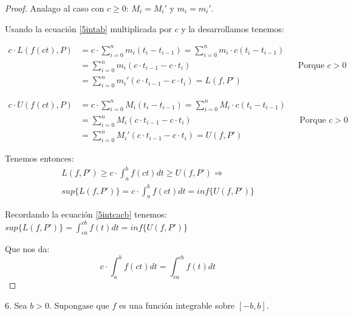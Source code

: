 \documentclass[12pt]{article}
\begin{document}
\begin{proof}
    Analago al caso con $c\geq0$: $M_i=M_i'$ y $m_i=m_i'$.

    Usando la ecuaci\'on \eqref{5intab} multiplicada por $c$ y la desarrollamos tenemos:

    \begin{align*}
        c\cdot L(f(ct),P) &= c \cdot \sum_{i=0}^n m_i(t_i-t_{i-1}) = \sum_{i=0}^n m_i\cdot c(t_i-t_{i-1}) \\
        &= \sum_{i=0}^n m_i(c\cdot t_{i-1}-c\cdot t_i) \quad &&\text{Porque $c>0$}\\
        &= \sum_{i=0}^n m_i'(c\cdot t_{i-1}-c\cdot t_i) = L(f,P')
    \end{align*}

    \begin{align*}
        c\cdot U(f(ct),P) &= c \cdot \sum_{i=0}^n M_i(t_i-t_{i-1}) = \sum_{i=0}^n M_i\cdot c(t_i-t_{i-1}) \\
        &= \sum_{i=0}^n M_i(c\cdot t_{i-1}-c\cdot t_i) \quad &&\text{Porque $c>0$}\\
        &= \sum_{i=0}^n M_i'(c\cdot t_{i-1}-c\cdot t_i) = U(f,P')
    \end{align*}

    Tenemos entonces:
    \begin{multline*}
        L(f,P')\geq c\cdot\int_{a}^{b}f(ct)dt\geq U(f,P') \Longrightarrow \\ sup\{L(f,P')\}=c\cdot\int_{a}^{b}f(ct)dt=inf\{U(f,P')\}
    \end{multline*}

    Recordando la ecuaci\'on \eqref{5intcacb} tenemos: \(sup\{L(f,P')\}=\displaystyle\int_{ca}^{cb}f(t)dt=inf\{U(f,P')\}\)

    Que nos da:
    \begin{equation*}
        c\cdot\int_{a}^{b}f(ct)dt=\int_{ca}^{cb}f(t)dt
    \end{equation*}

\end{proof}

6. Sea $b>0$. Supongase que $f$ es una funci\'on integrable sobre $[-b,b]$.
\end{document}

